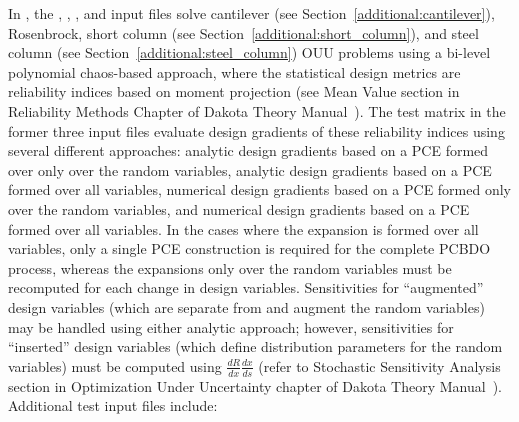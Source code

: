 In , the ,
,
, and
 input files solve cantilever
(see Section~\ref{additional:cantilever}), Rosenbrock, short column
(see Section~\ref{additional:short_column}), and steel column (see
Section~\ref{additional:steel_column}) OUU problems using a bi-level
polynomial chaos-based approach, where the statistical design metrics
are reliability indices based on moment projection (see Mean Value
section in Reliability Methods Chapter of Dakota Theory
Manual~\cite{TheoMan}). The test matrix in the former three input
files evaluate design gradients of these reliability indices using
several different approaches: analytic design gradients based on a PCE
formed over only over the random variables, analytic design gradients
based on a PCE formed over all variables, numerical design gradients
based on a PCE formed only over the random variables, and numerical
design gradients based on a PCE formed over all variables. In the
cases where the expansion is formed over all variables, only a single
PCE construction is required for the complete PCBDO process, whereas
the expansions only over the random variables must be recomputed for
each change in design variables. Sensitivities for ``augmented''
design variables (which are separate from and augment the random
variables) may be handled using either analytic approach; however,
sensitivities for ``inserted'' design variables (which define
distribution parameters for the random variables) must be 
computed using $\frac{dR}{dx} \frac{dx}{ds}$ (refer to Stochastic
Sensitivity Analysis section in Optimization Under Uncertainty chapter
of Dakota Theory Manual~\cite{TheoMan}). Additional test input files
include:
